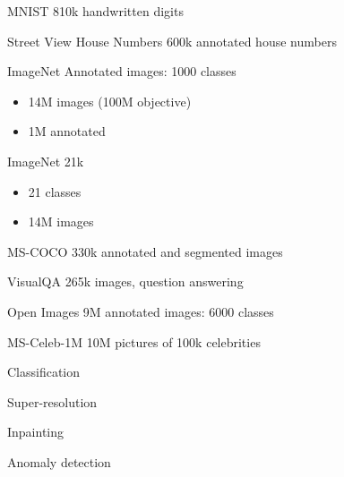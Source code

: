 \begin{frame}{MNIST}
  810k handwritten digits
\end{frame}

\begin{frame}{Street View House Numbers}
  600k annotated house numbers
\end{frame}

\begin{frame}{ImageNet}
  Annotated images: 1000 classes
  \begin{itemize}
    \item 14M images (100M objective)
    \item 1M annotated
  \end{itemize}
\end{frame}

\begin{frame}{ImageNet 21k}
  \begin{itemize}
    \item 21 classes
    \item 14M images
  \end{itemize}
\end{frame}

\begin{frame}{MS-COCO}
   330k annotated and segmented images
\end{frame}

\begin{frame}{VisualQA}
  265k images, question answering
\end{frame}

\begin{frame}{Open Images}
  9M annotated images: 6000 classes
\end{frame}

\begin{frame}{MS-Celeb-1M}
  10M pictures of 100k celebrities
\end{frame}

\begin{frame}{Classification}
\end{frame}

\begin{frame}{Super-resolution}
\end{frame}

\begin{frame}{Inpainting}
\end{frame}

\begin{frame}{Anomaly detection}
\end{frame}

